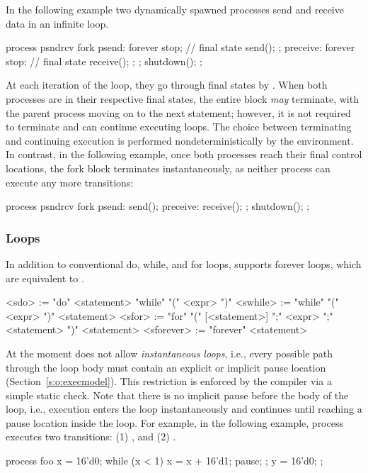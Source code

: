 In the following example two dynamically spawned processes send 
and receive data in an infinite loop.
\begin{tsllisting2}
process psndrcv {
  fork {
    psend:    forever {
                  stop;   // final state
                  send();
              };
    preceive: forever {
                  stop;   // final state
                  receive();
              };
  };
  shutdown();
};
\end{tsllisting2}
At each iteration of the loop, they go through final states by 
.  When both processes are in their respective final 
states, the entire  block \emph{may} terminate, with the 
parent process moving on to the next statement; however, it is not 
required to terminate and can continue executing  
loops.  The choice between terminating and continuing execution is 
performed nondeterministically by the environment.  In contrast, 
in the following example, once both processes reach their final 
control locations, the fork block terminates instantaneously, as 
neither process can execute any more transitions:
\begin{tsllisting2}
process psndrcv {
  fork {
    psend:    send();
    preceive: receive();
  };
  shutdown();
};
\end{tsllisting2}

\subsubsection{Loops}  

In addition to conventional do, while, and for loops, \tsl 
supports forever loops, which are equivalent to .
\begin{bnflisting}
<sdo>      := "do" <statement> "while" "(" <expr> ")"
<swhile>   := "while" "(" <expr> ")" <statement>
<sfor>     := "for" "(" [<statement>] ";" 
                        <expr> ";" 
                        <statement> ")" 
                  <statement>
<sforever> := "forever" <statement>
\end{bnflisting}

At the moment \tsl does not allow \emph{instantaneous loops}, 
i.e., every possible path through the loop body must contain an 
explicit or implicit pause location (Section~\ref{s:o:execmodel}).  
This restriction is enforced by the compiler via a simple static 
check.  Note that there is no implicit pause before the body of the 
loop, i.e., execution enters the loop instantaneously and 
continues until reaching a pause location inside the loop.  For 
example, in the following example, process  executes two 
transitions: (1) , and 
(2) .
\begin{tsllisting2}
process foo {
    x = 16'd0;
    while (x < 1) {
        x = x + 16'd1;
        pause;
    };
    y = 16'd0;
};
\end{tsllisting2}

